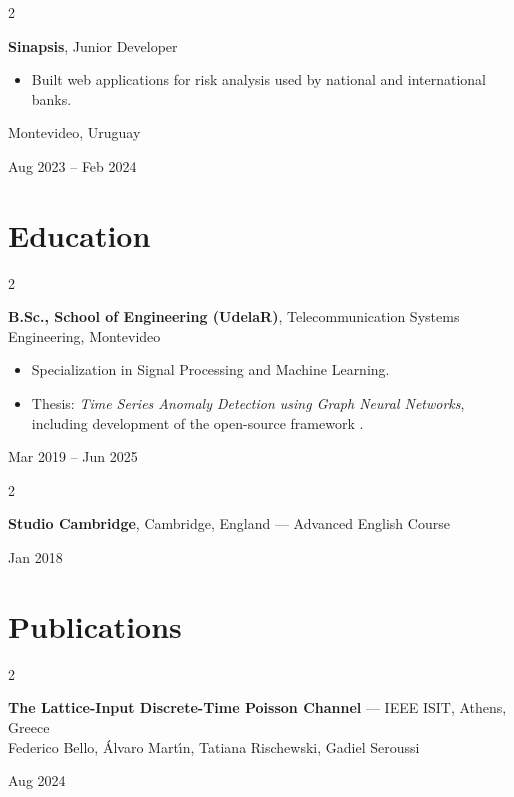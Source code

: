 \documentclass[10pt, letterpaper]{article}
\newenvironment{highlights}{
    \begin{itemize}[
        topsep=0.10 cm,
        parsep=0.10 cm,
        partopsep=0pt,
        itemsep=0pt,
        leftmargin=0.4 cm + 10pt
    ]
}{
    \end{itemize}
} %
\newenvironment{twocolentry}[2][]{
    \onecolentry
    \def\secondColumn{#2}
    \setcolumnwidth{\fill, 4 cm}
    \begin{paracol}{2}
}{
    \switchcolumn \raggedleft \secondColumn
    \end{paracol}
    \endonecolentry
} %
\let\hrefWithoutArrow\href
\renewcommand{\href}[2]{\hrefWithoutArrow{#1}{\ifthenelse{\equal{#2}{}}{ }{#2 }\raisebox{.15ex}{\footnotesize \faExternalLink*}}}
\begin{document}
    \vspace{0.1 cm}

    \begin{twocolentry}{
        Montevideo, Uruguay

    Aug 2023 -- Feb 2024
    }
        \textbf{Sinapsis}, Junior Developer
        \begin{highlights}
            \item Built web applications for risk analysis used by national and international banks.
        \end{highlights}
    \end{twocolentry}

        \section{Education}

        \begin{twocolentry}{
            Mar 2019 -- Jun 2025
        }
        \textbf{B.Sc., School of Engineering (UdelaR)}, Telecommunication Systems Engineering, Montevideo
        \begin{highlights}
            \item Specialization in Signal Processing and Machine Learning.
            \item Thesis: \textit{Time Series Anomaly Detection using Graph Neural Networks}, including development of the open-source framework \href{https://github.com/GraGODs/GraGOD}{GraGOD}.
        \end{highlights}
        \end{twocolentry}
        
        \vspace{0.1cm}
        
        \begin{twocolentry}{Jan 2018}
\textbf{Studio Cambridge}, Cambridge, England — Advanced English Course
\end{twocolentry}



    \section{Publications}
\begin{twocolentry}{
    Aug 2024
}
\textbf{The Lattice-Input Discrete-Time Poisson Channel} — IEEE ISIT, Athens, Greece\\
Federico Bello, \'{A}lvaro Mart\'\i n, Tatiana Rischewski, Gadiel Seroussi
\end{twocolentry}
\end{document}

